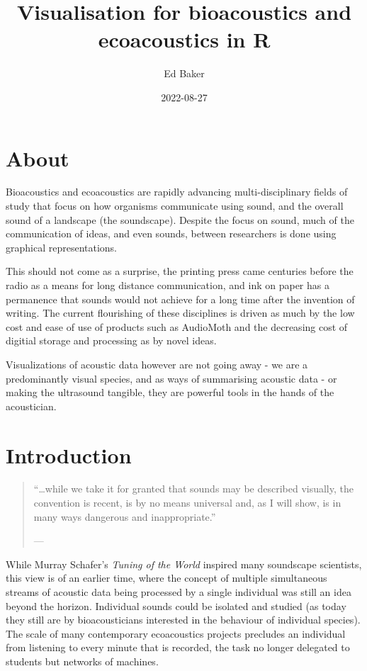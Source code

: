 \documentclass[
]{book}
\title{Visualisation for bioacoustics and ecoacoustics in R}
\author{Ed Baker}
\date{2022-08-27}
\begin{document}
\maketitle

{
\setcounter{tocdepth}{1}
\tableofcontents
}
\hypertarget{about}{%
\chapter*{About}\label{about}}

Bioacoustics and ecoacoustics are rapidly advancing multi-disciplinary fields of study that focus on how organisms communicate using sound, and the overall sound of a landscape (the soundscape). Despite the focus on sound, much of the communication of ideas, and even sounds, between researchers is done using graphical representations.

This should not come as a surprise, the printing press came centuries before the radio as a means for long distance communication, and ink on paper has a permanence that sounds would not achieve for a long time after the invention of writing. The current flourishing of these disciplines is driven as much by the low cost and ease of use of products such as AudioMoth and the decreasing cost of digitial storage and processing as by novel ideas.

Visualizations of acoustic data however are not going away - we are a predominantly visual species, and as ways of summarising acoustic data - or making the ultrasound tangible, they are powerful tools in the hands of the acoustician.

\hypertarget{intro}{%
\chapter{Introduction}\label{intro}}

\begin{quote}
``\ldots while we take it for granted that sounds may be described visually, the convention is recent, is by no means universal and, as I will show, is in many ways dangerous and inappropriate.''

\hfill --- \citet{schafer1977}
\end{quote}

While Murray Schafer's \emph{Tuning of the World} \citep{schafer1977} inspired many soundscape scientists, this view is of an earlier time, where the concept of multiple simultaneous streams of acoustic data being processed by a single individual was still an idea beyond the horizon. Individual sounds could be isolated and studied (as today they still are by bioacousticians interested in the behaviour of individual species). The scale of many contemporary ecoacoustics projects precludes an individual from listening to every minute that is recorded, the task no longer delegated to students but networks of machines.
\end{document}
